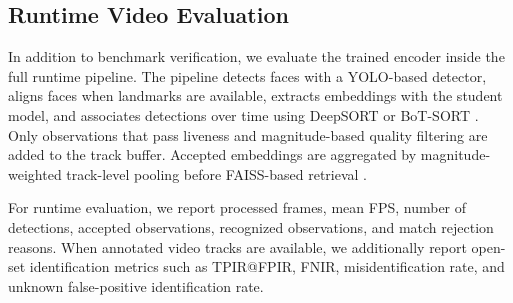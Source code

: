 \begin{table}[h]
\centering
\caption{Occlusion augmentation parameters per training variant. V2 uses aggressive blur; V3 and V4 use milder blur. V4 is identical to V3 in augmentation but has no SWA and uses gated spatial KD (active only in clean epochs 0--9). ``—'' = not used.}
\label{tab:aug_params}
\end{table}

\subsection{Runtime Video Evaluation}

In addition to benchmark verification, we evaluate the trained encoder inside the full runtime pipeline. The pipeline detects faces with a YOLO-based detector, aligns faces when landmarks are available, extracts embeddings with the student model, and associates detections over time using DeepSORT or BoT-SORT \cite{deepsort,botsort}. Only observations that pass liveness and magnitude-based quality filtering are added to the track buffer. Accepted embeddings are aggregated by magnitude-weighted track-level pooling before FAISS-based retrieval \cite{faiss}.

For runtime evaluation, we report processed frames, mean FPS, number of detections, accepted observations, recognized observations, and match rejection reasons. When annotated video tracks are available, we additionally report open-set identification metrics such as TPIR@FPIR, FNIR, misidentification rate, and unknown false-positive identification rate.

